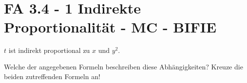 \section{FA 3.4 - 1 Indirekte Proportionalität - MC - BIFIE}

\begin{beispiel}[FA 3.4]{1} %
$t$ ist indirekt proportional zu $x$ und $y^2$.

Welche der angegebenen Formeln beschreiben diese Abhängigkeiten? Kreuze die beiden zutreffenden Formeln an!
\end{beispiel}
